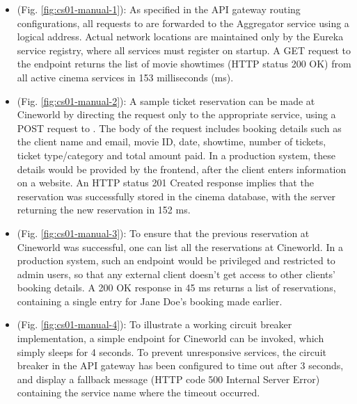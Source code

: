 \begin{itemize}
  \item {} (Fig. \ref{fig:cs01-manual-1}): As specified in the API gateway routing configurations, all requests to  are forwarded to the Aggregator service using a logical address. Actual network locations are maintained only by the Eureka service registry, where all services must register on startup. A GET request to the  endpoint returns the list of movie showtimes (HTTP status 200 OK) from all active cinema services in 153 milliseconds (ms).

  \item {} (Fig. \ref{fig:cs01-manual-2}): A sample ticket reservation can be made at Cineworld by directing the request only to the appropriate service, using a POST request to . The body of the request includes booking details such as the client name and email, movie ID, date, showtime, number of tickets, ticket type/category and total amount paid. In a production system, these details would be provided by the frontend, after the client enters information on a website. An HTTP status 201 Created response implies that the reservation was successfully stored in the cinema database, with the server returning the new reservation in 152 ms.

  \item {} (Fig. \ref{fig:cs01-manual-3}): To ensure that the previous reservation at Cineworld was successful, one can list all the reservations at Cineworld. In a production system, such an endpoint would be privileged and restricted to admin users, so that any external client doesn't get access to other clients' booking details. A 200 OK response in 45 ms returns a list of reservations, containing a single entry for Jane Doe's booking made earlier.

  \item {} (Fig. \ref{fig:cs01-manual-4}): To illustrate a working circuit breaker implementation, a simple  endpoint for Cineworld can be invoked, which simply sleeps for 4 seconds. To prevent unresponsive services, the circuit breaker in the API gateway has been configured to time out after 3 seconds, and display a fallback message (HTTP code 500 Internal Server Error) containing the service name where the timeout occurred.
\end{itemize}


